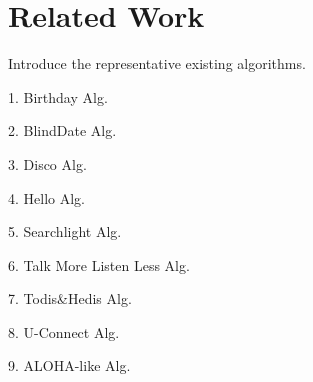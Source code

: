 \section{Related Work}
\label{RW}

Introduce the representative existing algorithms.

1. Birthday Alg.

2. BlindDate Alg.

3. Disco Alg.

4. Hello Alg.

5. Searchlight Alg.

6. Talk More Listen Less Alg.

7. Todis\&Hedis Alg.

8. U-Connect Alg.

9.  ALOHA-like Alg.




